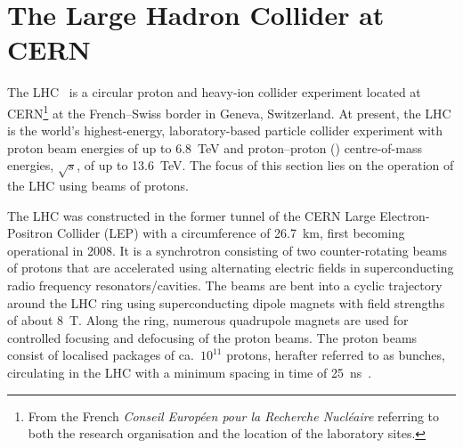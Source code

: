 \section{The Large Hadron Collider at CERN}%
\label{sec:lhc}

The LHC~\cite{Evans:2008zzb} is a circular proton and heavy-ion collider
experiment located at CERN\footnote{From the French \emph{Conseil Européen pour
    la Recherche Nucléaire} referring to both the research organisation and the
  location of the laboratory sites.} at the French--Swiss border in Geneva,
Switzerland. At present, the LHC is the world's highest-energy, laboratory-based
particle collider experiment with proton beam energies of up to \SI{6.8}{\TeV}
and proton--proton (\pp) centre-of-mass energies, $\sqrt{s}$, of up to
\SI{13.6}{\TeV}. The focus of this section lies on the operation of the LHC
using beams of protons.

The LHC was constructed in the former tunnel of the CERN Large Electron-Positron
Collider (LEP) with a circumference of \SI{26.7}{\kilo\metre}, first becoming
operational in 2008. It is a synchrotron consisting of two counter-rotating
beams of protons that are accelerated using alternating electric fields in
superconducting radio frequency resonators/cavities. The beams are bent into a
cyclic trajectory around the LHC ring using superconducting dipole magnets with
field strengths of about \SI{8}{\tesla}. Along the ring, numerous quadrupole
magnets are used for controlled focusing and defocusing of the proton beams.
The proton beams consist of localised packages of ca.\ $10^{11}$ protons,
herafter referred to as bunches, circulating in the LHC with a minimum spacing
in time of \SI{25}{\nano\second}~\cite{Evans:2008zzb}.


